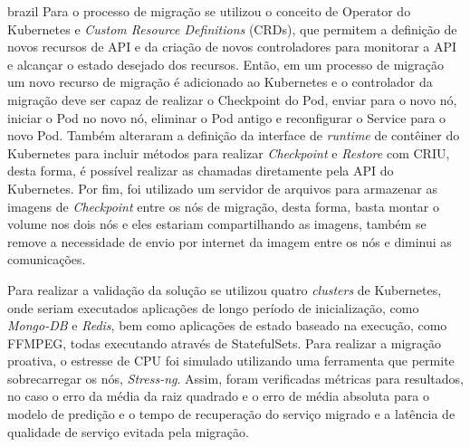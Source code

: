 \begin{otherlanguage*}{brazil}
Para o processo de migração se utilizou o conceito de Operator do Kubernetes
e \textit{Custom Resource Definitions} (CRDs), que permitem a definição de
novos recursos de API e da criação de novos controladores para monitorar a
API e alcançar o estado desejado dos recursos. Então, em um processo de
migração um novo recurso de migração é adicionado ao Kubernetes e o
controlador da migração deve ser capaz de realizar o Checkpoint do Pod, enviar
para o novo nó, iniciar o Pod no novo nó, eliminar o Pod antigo e reconfigurar
o Service para o novo Pod. Também alteraram a definição da interface de
\textit{runtime} de contêiner do Kubernetes para incluir métodos para realizar
\textit{Checkpoint} e \textit{Restore} com CRIU, desta forma, é possível realizar
as chamadas diretamente pela API do Kubernetes. Por fim, foi utilizado um servidor
de arquivos para armazenar as imagens de \textit{Checkpoint} entre os nós de
migração, desta forma, basta montar o volume nos dois nós e eles estariam
compartilhando as imagens, também se remove a necessidade de envio
por internet da imagem entre os nós e diminui as comunicações.

Para realizar a validação da solução se utilizou quatro \textit{clusters} de
Kubernetes, onde seriam executados aplicações de longo período de inicialização,
como \textit{Mongo-DB} e \textit{Redis}, bem como aplicações de estado baseado na
execução, como FFMPEG, todas executando através de StatefulSets. Para realizar a
migração proativa, o estresse de CPU foi simulado utilizando uma ferramenta que
permite sobrecarregar os nós, \textit{Stress-ng}. Assim, foram verificadas métricas
para resultados, no caso o erro da média da raiz quadrado e o erro de média absoluta
para o modelo de predição e o tempo de recuperação do serviço migrado e a latência
de qualidade de serviço evitada pela migração.


\end{otherlanguage*}
